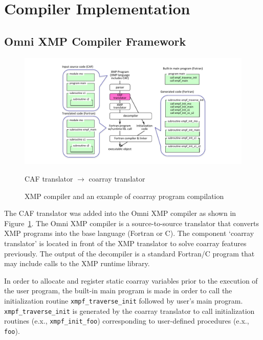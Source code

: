 \section{Compiler Implementation}\label{sec:compiler}



\subsection{Omni XMP Compiler Framework}

\begin{figure}[tbh]
 \begin{center}
  \includegraphics[trim=30mm 0mm 20mm 7mm, scale=1.0]{figs/translator-tmp.pdf}
  \caption{XMP compiler and an example of coarray program compilation}
  \label{fig:translator}
  CAF translator $\rightarrow$ coarray translator
 \end{center}
\end{figure}

The CAF translator was added into the Omni XMP compiler as shown in Figure~\ref{fig:translator}.
The Omni XMP compiler is a source-to-source translator that converts XMP programs into 
the base language (Fortran or C).  The component `coarray translator' is located in 
front of the XMP translator to solve coarray features previously. The output of the decompiler 
is a standard Fortran/C program that may include calls to the XMP runtime library.

In order to allocate and register static coarray variables prior to the execution of the user program, 
the built-in main program is made in order to call the initialization routine 
{\tt xmpf\_traverse\_init} followed by user’s main program.
{\tt xmpf\_traverse\_init} is generated by the coarray translator to call initialization 
routines (e.x., {\tt xmpf\_init\_foo}) corresponding to user-defined procedures (e.x., {\tt foo}).



